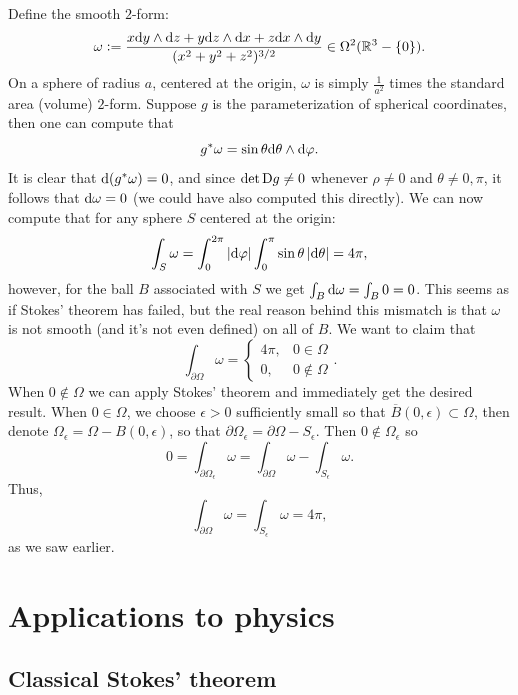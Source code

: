 \documentclass[11pt,a4paper]{article}
\begin{document}
\begin{example}
  Define the smooth $2$-form:
  \[
    \omega :=
    \frac{x \dy \wedge \dz + y \dz \wedge \dx + z \dx \wedge \dy}
    {(x^2 + y^2 + z^2)^{3/2}} \in \Omega^2(\R^3 - \set{0}).
  \]
  On a sphere of radius $a$, centered at the origin,
  $\omega$ is simply $\frac{1}{a^2}$ times the standard area (volume) $2$-form.
  Suppose $g$ is the parameterization of spherical coordinates,
  then one can compute that
  \[
    g^*\omega = \sin \theta \mathrm{d} \theta \wedge \mathrm{d} \varphi.
  \]
  It is clear that $\mathrm{d}(g^*\omega) = 0$,
  and since $\det \mathrm{D} g \neq 0$ whenever $\rho \neq 0$ and
  $\theta \neq 0,\pi$, it follows that $\mathrm{d} \omega = 0$
  (we could have also computed this directly).
  We can now compute that for any sphere $S$ centered at the origin:
  \[
    \int_S \omega =
    \int_{0}^{2\pi} \left\lvert\mathrm{d} \varphi\right\rvert \int_{0}^{\pi} \sin \theta \left\lvert\mathrm{d} \theta\right\rvert =
    4\pi,
  \]
  however, for the ball $B$ associated with $S$ we get
  $\int_{B} \mathrm{d} \omega = \int_{B} 0 = 0$.
  This seems as if Stokes' theorem has failed,
  but the real reason behind this mismatch is that $\omega$ is not
  smooth (and it's not even defined) on all of $B$.
  We want to claim that
  \[
    \int_{\partial \Omega} \omega =
    \begin{cases}
      4\pi, &0 \in \Omega \\
      0, &0 \notin \Omega
    \end{cases}.
  \]
  When $0 \notin \Omega$ we can apply Stokes' theorem and immediately
  get the desired result.
  When $0 \in \Omega$, we choose $\epsilon > 0$ sufficiently small
  so that $\overline B(0,\epsilon) \subset \Omega$,
  then denote $\Omega_{\epsilon} = \Omega - B(0,\epsilon)$,
  so that $\partial \Omega_{\epsilon} = \partial \Omega - S_{\epsilon}$.
  Then $0 \notin \Omega_{\epsilon}$ so
  \[
    0 =
    \int_{\partial \Omega_{\epsilon}} \omega =
    \int_{\partial \Omega} \omega - \int_{S_{\epsilon}} \omega.
  \]
  Thus,
  \[
    \int_{\partial \Omega} \omega =
    \int_{S_{\epsilon}} \omega = 4\pi,
  \]
  as we saw earlier.
\end{example}

\newpage

\section{Applications to physics}

\subsection{Classical Stokes' theorem}
\end{document}
